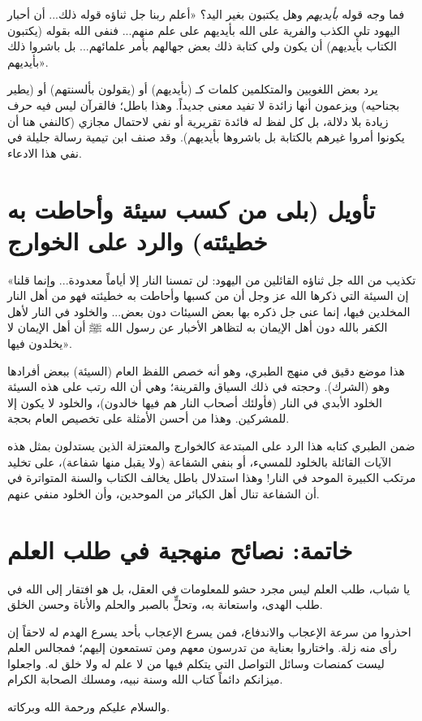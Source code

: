  فما وجه قوله \textit{بأيديهم} وهل يكتبون بغير اليد؟
 «أعلم ربنا جل ثناؤه قوله ذلك... أن أحبار اليهود تلي الكذب والفرية على الله بأيديهم على علم منهم... فنفى الله بقوله (يكتبون الكتاب بأيديهم) أن يكون ولي كتابة ذلك بعض جهالهم بأمر علمائهم... بل باشروا ذلك بأيديهم».

\begin{fawaid}
يرد بعض اللغويين والمتكلمين كلمات كـ (بأيديهم) أو (يقولون بألسنتهم) أو (يطير بجناحيه) ويزعمون أنها زائدة لا تفيد معنى جديداً. وهذا باطل؛ فالقرآن ليس فيه حرف زيادة بلا دلالة، بل كل لفظ له فائدة تقريرية أو نفي لاحتمال مجازي (كالنفي هنا أن يكونوا أمروا غيرهم بالكتابة بل باشروها بأيديهم). وقد صنف ابن تيمية رسالة جليلة في نفي هذا الادعاء.
\end{fawaid}

\separator

\section{تأويل (بلى من كسب سيئة وأحاطت به خطيئته) والرد على الخوارج}
 «تكذيب من الله جل ثناؤه القائلين من اليهود: لن تمسنا النار إلا أياماً معدودة... وإنما قلنا إن السيئة التي ذكرها الله عز وجل أن من كسبها وأحاطت به خطيئته فهو من أهل النار المخلدين فيها، إنما عنى جل ذكره بها بعض السيئات دون بعض... والخلود في النار لأهل الكفر بالله دون أهل الإيمان به لتظاهر الأخبار عن رسول الله ﷺ أن أهل الإيمان لا يخلدون فيها».

\begin{fawaid}
هذا موضع دقيق في منهج الطبري، وهو أنه خصص اللفظ العام (السيئة) ببعض أفرادها وهو (الشرك). وحجته في ذلك السياق والقرينة؛ وهي أن الله رتب على هذه السيئة الخلود الأبدي في النار (فأولئك أصحاب النار هم فيها خالدون)، والخلود لا يكون إلا للمشركين. وهذا من أحسن الأمثلة على تخصيص العام بحجة.
\end{fawaid}

\begin{fawaid}
ضمن الطبري كتابه هذا الرد على المبتدعة كالخوارج والمعتزلة الذين يستدلون بمثل هذه الآيات القائلة بالخلود للمسيء، أو بنفي الشفاعة (ولا يقبل منها شفاعة)، على تخليد مرتكب الكبيرة الموحد في النار! وهذا استدلال باطل يخالف الكتاب والسنة المتواترة في أن الشفاعة تنال أهل الكبائر من الموحدين، وأن الخلود منفي عنهم.
\end{fawaid}

\separator

\section{خاتمة: نصائح منهجية في طلب العلم}
يا شباب، طلب العلم ليس مجرد حشو للمعلومات في العقل، بل هو افتقار إلى الله في طلب الهدى، واستعانة به، وتحلٍّ بالصبر والحلم والأناة وحسن الخلق.

احذروا من سرعة الإعجاب والاندفاع، فمن يسرع الإعجاب بأحد يسرع الهدم له لاحقاً إن رأى منه زلة. واختاروا بعناية من تدرسون معهم ومن تستمعون إليهم؛ فمجالس العلم ليست كمنصات وسائل التواصل التي يتكلم فيها من لا علم له ولا خلق له. واجعلوا ميزانكم دائماً كتاب الله وسنة نبيه، ومسلك الصحابة الكرام. 

والسلام عليكم ورحمة الله وبركاته.
